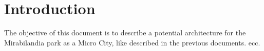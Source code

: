 \section*{Introduction}
\label{sec:introduction}

The objective of this document is to describe a potential architecture for the Mirabilandia park as a Micro City,
like described in the previous documents.
ecc.